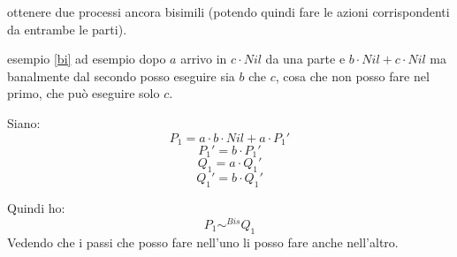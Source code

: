 \documentclass[a4paper,12pt, oneside]{book}
\begin{document}
ottenere due processi ancora bisimili (potendo quindi fare le azioni
corrispondenti da entrambe le parti).
\begin{esempio}
  esempio \ref{bi} ad esempio dopo $a$ arrivo in $c\cdot Nil$ da una parte e
  $b\cdot Nil+ c\cdot Nil$ ma banalmente dal secondo posso eseguire sia $b$ che
  $c$, cosa che non posso fare nel primo, che può eseguire solo $c$.
\end{esempio}
\begin{esempio}
  Siano:
  \[P_1=a\cdot b\cdot Nil+a\cdot P_1'\]
  \[P_1'=b\cdot P_1'\]
  \[Q_1=a\cdot Q_1'\]
  \[Q_1'=b\cdot Q_1'\]
  \begin{center}
  \end{center}
  \begin{center}
  \end{center}
  Quindi ho:
  \[P_1\sim^{Bis}Q_1\]
  Vedendo che i passi che posso fare nell'uno li posso fare anche
  nell'altro.
\end{esempio}
\end{document}

